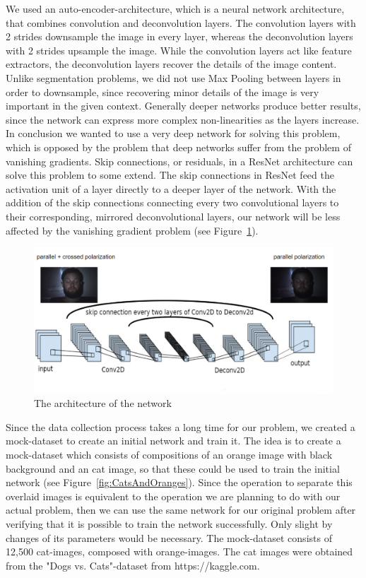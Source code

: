 \documentclass[sigconf]{acmart}
\begin{document}
We used an auto-encoder-architecture, which is a neural network architecture, that combines convolution and deconvolution layers. The convolution layers with 2 strides downsample the image in every layer, whereas the deconvolution layers with 2 strides upsample the image. While the convolution layers act like feature extractors, the deconvolution layers recover the details of the image content. Unlike segmentation problems, we did not use Max Pooling between layers in order to downsample, since recovering minor details of the image is very important in the given context. Generally deeper networks produce better results, since the network can express more complex non-linearities as the layers increase. In conclusion we wanted to use a very deep network for solving this problem, which is opposed by the problem that deep networks suffer from the problem of vanishing gradients. Skip connections, or residuals, in a ResNet architecture can solve this problem to some extend. The skip connections in ResNet feed the activation unit of a layer directly to a deeper layer of the network. With the addition of the skip connections connecting every two convolutional layers to their corresponding, mirrored deconvolutional layers, our network will be less affected by the vanishing gradient problem (see Figure~\ref{fig:NetworkArchitecture}).

\begin{figure}[h]
	\centering
	\includegraphics[width=\linewidth]{figures/network.png}
	\caption{The architecture of the network}
	\label{fig:NetworkArchitecture}
\end{figure}

Since the data collection process takes a long time for our problem, we created a mock-dataset to create an initial network and train it. The idea is to create a mock-dataset which consists of compositions of an orange image with black background and an cat image, so that these could be used to train the initial network (see Figure~\ref{fig:CatsAndOranges}). Since the operation to separate this overlaid images is equivalent to the operation we are planning to do with our actual problem, then we can use the same network for our original problem after verifying that it is possible to train the network successfully. Only slight by changes of its parameters would be necessary. The mock-dataset consists of 12,500 cat-images, composed with orange-images. The cat images were obtained from the "Dogs vs. Cats"-dataset from https://kaggle.com.
\end{document}
